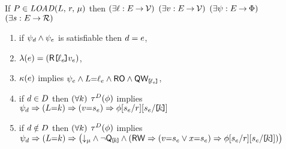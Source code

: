 \begin{figure*}
\begin{center}
\begin{minipage}{1.0\textwidth}

  \noindent
  If $\aPS \in \sLOAD[\amode]{\cExp}{\aReg}$ then
  $(\exists\cVal:\aEvs\fun\Val)$
  $(\exists\aVal:\aEvs\fun\Val)$
  $(\exists\bForm:\aEvs\fun\Formulae)$
  $(\exists\bReg:\aEvs\fun\Reg)$
  \begin{enumerate}
  \item if $\bForm_\bEv\land\bForm_\aEv$ is satisfiable then $\bEv=\aEv$,
  \item $\labelingAct(\aEv) = \DRREFP{\cVal_\aEv}{\aVal_\aEv}$,
  \item $\labelingForm(\aEv)$ implies
    \begin{math}
      \bForm_\aEv
      \land \cExp{=}\cVal_\aEv
      \land \RO
      \land \QwREF{\cVal_\aEv}
    \end{math},
  \item if $\bEv\in\bEvs$ then
    \begin{math}
      (\forall\dVal)
    \end{math}
    $\aTr[\bEvs](\aForm)$ implies
    \begin{math}
      \bForm_\bEv
      \limplies (\cExp{=}\dVal)
      \limplies (\aVal{=}\bReg_\aEv)
      \limplies \aForm[\bReg_\aEv/\aReg][\bReg_\aEv/\REF{\dVal}]
    \end{math}
  \item if $\bEv\notin\bEvs$ then
    \begin{math}
      (\forall\dVal)
    \end{math}
    $\aTr[\bEvs](\aForm)$ implies
    \begin{math}
      \bForm_\bEv
      \limplies (\cExp{=}\dVal)
      \limplies \PBRbig{        
        \Dmode{\amode}
        \land \lnot\QxREF{\dVal}
        \land
        (\RW
         \limplies (\aVal{=}\bReg_\aEv\lor\aLoc{=}\bReg_\aEv) 
         \limplies \aForm[\bReg_\aEv/\aReg][\bReg_\aEv/\REF{\dVal}]
        )
}
\end{math}
\end{enumerate}
\end{minipage}
\end{center}
\end{figure*}
